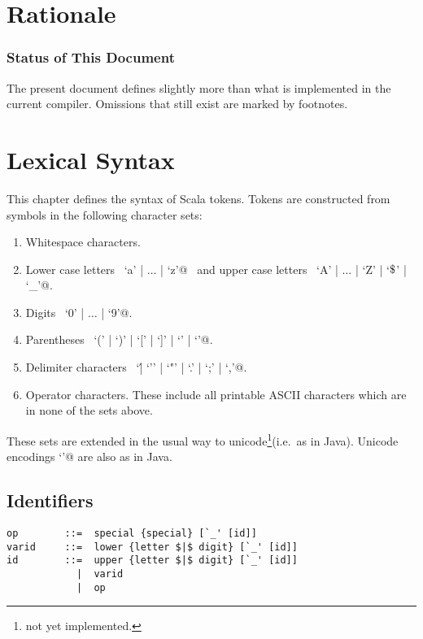 \documentclass[a4paper,12pt,twoside,titlepage]{book}
\renewcommand{\todo}[1]{{$\clubsuit$\bf todo: #1$\spadesuit$}}
\newcommand{\notyet}{\footnote{not yet implemented.}}
\begin{document}
\frontmatter
\makedoctitle
\clearemptydoublepage
\tableofcontents
\mainmatter
\sloppy



\chapter{Rationale}



\subsection*{Status of This Document}

The present document defines slightly more than what is implemented in
the current compiler. Omissions that still exist are marked by footnotes.

\chapter{Lexical Syntax}

This chapter defines the syntax of Scala tokens. Tokens are
constructed from symbols in the following character sets:
\begin{enumerate}
\item Whitespace characters.
\item Lower case letters ~\lstinline@`a' | $\ldots$ | `z'@~  and
upper case letters ~\lstinline@`A' | $\ldots$ | `Z' | `$\mbox{\$}$' | `_'@.
\item Digits ~\lstinline@`0' | $\ldots$ | `9'@.
\item Parentheses ~\lstinline@`(' | `)' | `[' | `]' | `{' | `}'@.
\item Delimiter characters ~\lstinline@`\' | `'' | `"' | `.' | `;' | `,'@.
\item Operator characters. These include all printable ASCII characters
which are in none of the sets above.
\end{enumerate}

These sets are extended in the usual way to unicode\notyet (i.e.\ as in Java).
Unicode encodings \lstinline@`\uXXXX'@ are also as in Java.

\section{Identifiers}

\syntax\begin{lstlisting}
op        ::=  special {special} [`_' [id]]
varid     ::=  lower {letter $|$ digit} [`_' [id]]
id        ::=  upper {letter $|$ digit} [`_' [id]]
            |  varid
            |  op
\end{lstlisting}
\end{document}
